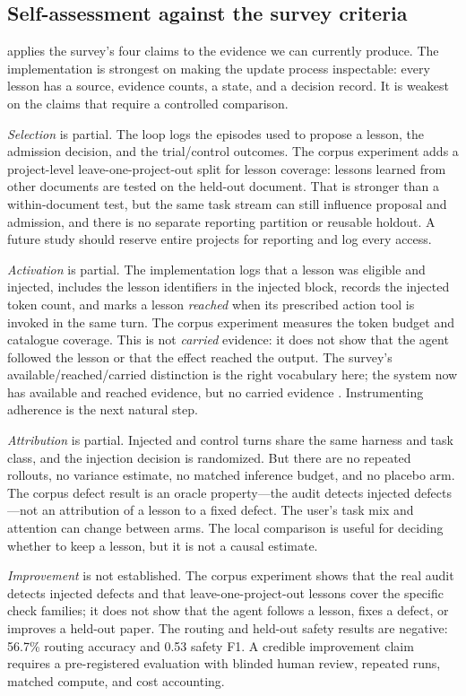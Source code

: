 \subsection{Self-assessment against the survey criteria}
\label{sec:self-assessment}
 applies the survey's four claims to the evidence we can currently produce. The implementation is strongest on making the update process inspectable: every lesson has a source, evidence counts, a state, and a decision record. It is weakest on the claims that require a controlled comparison.

\emph{Selection} is partial. The loop logs the episodes used to propose a lesson, the admission decision, and the trial/control outcomes. The corpus experiment adds a project-level leave-one-project-out split for lesson coverage: lessons learned from other documents are tested on the held-out document. That is stronger than a within-document test, but the same task stream can still influence proposal and admission, and there is no separate reporting partition or reusable holdout. A future study should reserve entire projects for reporting and log every access.

\emph{Activation} is partial. The implementation logs that a lesson was eligible and injected, includes the lesson identifiers in the injected block, records the injected token count, and marks a lesson \emph{reached} when its prescribed action tool is invoked in the same turn. The corpus experiment measures the token budget and catalogue coverage. This is not \emph{carried} evidence: it does not show that the agent followed the lesson or that the effect reached the output. The survey's available/reached/carried distinction is the right vocabulary here; the system now has available and reached evidence, but no carried evidence \citep{wei2026harnessrsi}. Instrumenting adherence is the next natural step.

\emph{Attribution} is partial. Injected and control turns share the same harness and task class, and the injection decision is randomized. But there are no repeated rollouts, no variance estimate, no matched inference budget, and no placebo arm. The corpus defect result is an oracle property---the audit detects injected defects---not an attribution of a lesson to a fixed defect. The user's task mix and attention can change between arms. The local comparison is useful for deciding whether to keep a lesson, but it is not a causal estimate.

\emph{Improvement} is not established. The corpus experiment shows that the real audit detects injected defects and that leave-one-project-out lessons cover the specific check families; it does not show that the agent follows a lesson, fixes a defect, or improves a held-out paper. The routing and held-out safety results are negative: 56.7\% routing accuracy and 0.53 safety F1. A credible improvement claim requires a pre-registered evaluation with blinded human review, repeated runs, matched compute, and cost accounting.


